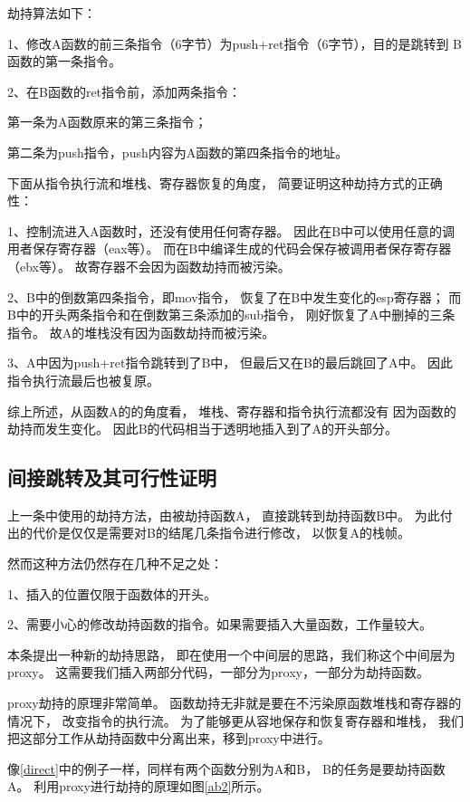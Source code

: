 劫持算法如下：

1、修改A函数的前三条指令（6字节）为push+ret指令（6字节），目的是跳转到
B函数的第一条指令。

2、在B函数的ret指令前，添加两条指令：

第一条为A函数原来的第三条指令；

第二条为push指令，push内容为A函数的第四条指令的地址。

下面从指令执行流和堆栈、寄存器恢复的角度，
简要证明这种劫持方式的正确性：

1、控制流进入A函数时，还没有使用任何寄存器。
因此在B中可以使用任意的调用者保存寄存器（eax等）。
而在B中编译生成的代码会保存被调用者保存寄存器（ebx等）。
故寄存器不会因为函数劫持而被污染。

2、B中的倒数第四条指令，即mov指令，
恢复了在B中发生变化的esp寄存器；
而B中的开头两条指令和在倒数第三条添加的sub指令，
刚好恢复了A中删掉的三条指令。
故A的堆栈没有因为函数劫持而被污染。

3、A中因为push+ret指令跳转到了B中，
但最后又在B的最后跳回了A中。
因此指令执行流最后也被复原。

综上所述，从函数A的的角度看，
堆栈、寄存器和指令执行流都没有
因为函数的劫持而发生变化。
因此B的代码相当于透明地插入到了A的开头部分。

\subsection{间接跳转及其可行性证明}

上一条中使用的劫持方法，由被劫持函数A，
直接跳转到劫持函数B中。
为此付出的代价是仅仅是需要对B的结尾几条指令进行修改，
以恢复A的栈帧。

然而这种方法仍然存在几种不足之处：

1、插入的位置仅限于函数体的开头。

2、需要小心的修改劫持函数的指令。如果需要插入大量函数，工作量较大。

本条提出一种新的劫持思路，
即在使用一个中间层的思路，我们称这个中间层为proxy。
这需要我们插入两部分代码，一部分为proxy，一部分为劫持函数。

proxy劫持的原理非常简单。
函数劫持无非就是要在不污染原函数堆栈和寄存器的情况下，
改变指令的执行流。
为了能够更从容地保存和恢复寄存器和堆栈，
我们把这部分工作从劫持函数中分离出来，移到proxy中进行。

像\ref{direct}中的例子一样，同样有两个函数分别为A和B，
B的任务是要劫持函数A。
利用proxy进行劫持的原理如图\ref{ab2}所示。

